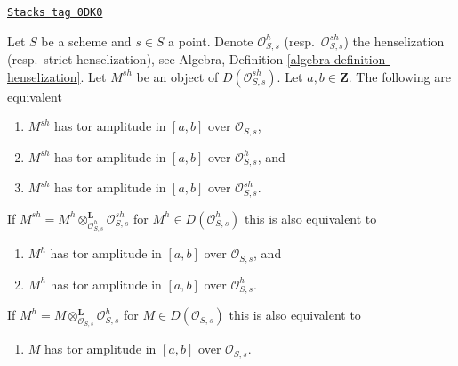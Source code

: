 \begin{lemma}
\label{flat-lemma-tor-amplitude-up-down-henselization}
\href{https://stacks.math.columbia.edu/tag/0DK0}{\texttt{Stacks tag 0DK0}}

Let $S$ be a scheme and $s \in S$ a point. Denote $\mathcal{O}_{S, s}^h$
(resp.\ $\mathcal{O}_{S, s}^{sh}$) the henselization (resp.\ strict
henselization), see
Algebra, Definition \ref{algebra-definition-henselization}.
Let $M^{sh}$ be an object of $D(\mathcal{O}_{S, s}^{sh})$.
Let $a, b \in \mathbf{Z}$.
The following are equivalent
\begin{enumerate}
\item $M^{sh}$ has tor amplitude in $[a, b]$ over $\mathcal{O}_{S, s}$,
\item $M^{sh}$ has tor amplitude in $[a, b]$ over $\mathcal{O}_{S, s}^h$, and
\item $M^{sh}$ has tor amplitude in $[a, b]$ over $\mathcal{O}_{S, s}^{sh}$.
\end{enumerate}
If $M^{sh} =
M^h \otimes_{\mathcal{O}_{S, s}^h}^\mathbf{L} \mathcal{O}_{S, s}^{sh}$
for $M^h \in D(\mathcal{O}_{S, s}^h)$ this is also equivalent to
\begin{enumerate}
\item[(4)] $M^h$ has tor amplitude in $[a, b]$ over $\mathcal{O}_{S, s}$, and
\item[(5)] $M^h$ has tor amplitude in $[a, b]$ over $\mathcal{O}_{S, s}^h$.
\end{enumerate}
If $M^h = M \otimes_{\mathcal{O}_{S, s}}^\mathbf{L} \mathcal{O}_{S, s}^h$
for $M \in D(\mathcal{O}_{S, s})$
this is also equivalent to
\begin{enumerate}
\item[(6)] $M$ has tor amplitude in $[a, b]$ over $\mathcal{O}_{S, s}$.
\end{enumerate}
\end{lemma}

